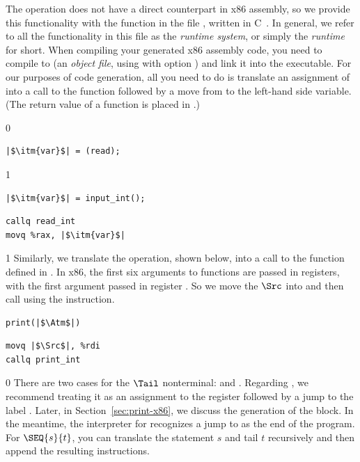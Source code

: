 \documentclass[7x10]{TimesAPriori_MIT}%
\def\racketEd{0}
\def\pythonEd{1}
\providecommand{\BookEdition}{1}
\let\edition\BookEdition
\newcommand{\pythonColor}[0]{}
\numberwithin{theorem}{chapter}
\numberwithin{definition}{chapter}
\numberwithin{equation}{chapter}
\begin{document}
The \READOP{} operation does not have a direct counterpart in x86
assembly, so we provide this functionality with the function
 in the file , written in
C~\citep{Kernighan:1988nx}. In general, we refer to all the
functionality in this file as the \emph{runtime system}, or simply the \emph{runtime} for short. When compiling your
generated x86 assembly code, you need to compile  to
 (an \emph{object file}, using  with option
) and link it into the executable. For our purposes of code
generation, all you need to do is translate an assignment of
\READOP{} into a call to the  function followed by a
move from  to the left-hand side variable.  (The
return value of a function is placed in .)  
\begin{transformation}
{\if\edition\racketEd  
\begin{lstlisting}
|$\itm{var}$| = (read);
\end{lstlisting}
\fi}
{\if\edition\pythonEd\pythonColor
\begin{lstlisting}
|$\itm{var}$| = input_int();
\end{lstlisting}
\fi}
\compilesto
\begin{lstlisting}
callq read_int
movq %rax, |$\itm{var}$|
\end{lstlisting}
\end{transformation}

{\if\edition\pythonEd\pythonColor
%
Similarly, we translate the  operation, shown below, into
a call to the  function defined in .
In x86, the first six arguments to functions are passed in registers,
with the first argument passed in register . So we move the
$\Src$ into  and then call  using the
 instruction.
\begin{transformation}
\begin{lstlisting}
print(|$\Atm$|)    
\end{lstlisting}
\compilesto
\begin{lstlisting}
movq |$\Src$|, %rdi
callq print_int  
\end{lstlisting}
\end{transformation}
%
\fi}  

{\if\edition\racketEd
%
There are two cases for the $\Tail$ nonterminal:  and
. Regarding , we recommend treating it as an
assignment to the  register followed by a jump to
the label . Later, in Section~\ref{sec:print-x86},
we discuss the generation of the  block.
In the meantime, the interpreter for \LangXVar{} recognizes a jump
to  as the end of the program.
For $\SEQ{s}{t}$, you can translate the statement $s$ and tail $t$
recursively and then append the resulting instructions.
%
\fi}
\end{document}
